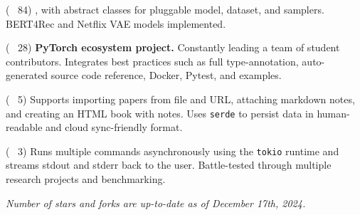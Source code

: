
\begin{cvlist}

  \cvlistitem
    {\href{https://github.com/jaywonchung/BERT4Rec-VAE-Pytorch}{} 
    {\normalfont( \faCodeFork~84)}} %
    {, with abstract classes for pluggable model, dataset, and samplers. BERT4Rec and Netflix VAE models implemented.} %

  \cvlistitem
    {\href{https://github.com/SymbioticLab/Zeus}{}
    {\normalfont( \faCodeFork~28)}} %
    { \textbf{PyTorch ecosystem project.} Constantly leading a team of student contributors. Integrates best practices such as full type-annotation, auto-generated source code reference, Docker, Pytest, and examples.} %

  \cvlistitem
    {\href{https://github.com/jaywonchung/reason}{}
    {\normalfont( \faCodeFork~5)}} %
    { Supports importing papers from file and URL, attaching markdown notes, and creating an HTML book with notes. Uses \texttt{serde} to persist data in human-readable and cloud sync-friendly format.} %

  \cvlistitem
    {\href{https://github.com/jaywonchung/pegasus}{}
    {\normalfont( \faCodeFork~3)}} %
    { Runs multiple commands asynchronously using the \texttt{tokio} runtime and streams stdout and stderr back to the user. Battle-tested through multiple research projects and benchmarking.} %

\end{cvlist}

\vspace{-5mm}

\begin{cvparagraph}
\textit{Number of stars and forks are up-to-date as of December 17th, 2024.}
\end{cvparagraph}
